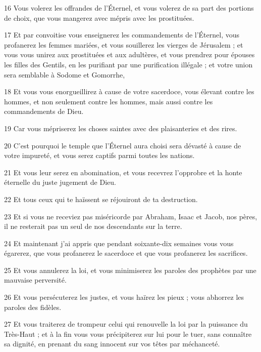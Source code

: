 \par 16 Vous volerez les offrandes de l'Éternel, et vous volerez de sa part des portions de choix, que vous mangerez avec mépris avec les prostituées.

\par 17 Et par convoitise vous enseignerez les commandements de l'Éternel, vous profanerez les femmes mariées, et vous souillerez les vierges de Jérusalem ; et vous vous unirez aux prostituées et aux adultères, et vous prendrez pour épouses les filles des Gentils, en les purifiant par une purification illégale ; et votre union sera semblable à Sodome et Gomorrhe,

\par 18 Et vous vous enorgueillirez à cause de votre sacerdoce, vous élevant contre les hommes, et non seulement contre les hommes, mais aussi contre les commandements de Dieu.

\par 19 Car vous mépriserez les choses saintes avec des plaisanteries et des rires.

\par 20 C'est pourquoi le temple que l'Éternel aura choisi sera dévasté à cause de votre impureté, et vous serez captifs parmi toutes les nations.

\par 21 Et vous leur serez en abomination, et vous recevrez l'opprobre et la honte éternelle du juste jugement de Dieu.

\par 22 Et tous ceux qui te haïssent se réjouiront de ta destruction.

\par 23 Et si vous ne receviez pas miséricorde par Abraham, Isaac et Jacob, nos pères, il ne resterait pas un seul de nos descendants sur la terre.

\par 24 Et maintenant j'ai appris que pendant soixante-dix semaines vous vous égarerez, que vous profanerez le sacerdoce et que vous profanerez les sacrifices.

\par 25 Et vous annulerez la loi, et vous minimiserez les paroles des prophètes par une mauvaise perversité.

\par 26 Et vous persécuterez les justes, et vous haïrez les pieux ; vous abhorrez les paroles des fidèles.

\par 27 Et vous traiterez de trompeur celui qui renouvelle la loi par la puissance du Très-Haut ; et à la fin vous vous précipiterez sur lui pour le tuer, sans connaître sa dignité, en prenant du sang innocent sur vos têtes par méchanceté.

